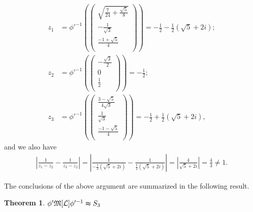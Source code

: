 \documentclass{amsart}
\newcommand{\LLL}{\mathcal L} %
\newcommand{\MMM}{\mathfrak M}
\newtheorem{theorem}{Theorem}[section]
\begin{document}
\begin{align*}
z_1 &= \phi'^{-1}( \left(
      \begin{array}{c}
       \sqrt{\frac{7}{24} + \frac{\sqrt{5}}{8}} \\
        -\frac{1}{\sqrt{3}} \\
       \frac{-1 + \sqrt{5}}{4} \\
      \end{array}
    \right) ) = -\frac{1}{2} - \frac{1}{2}(\sqrt{5} + 2i); \\
z_2 &= \phi'^{-1}(\left(
      \begin{array}{c}
        -\frac{\sqrt{3}}{2} \\
        0 \\
        \frac{1}{2} \\
      \end{array}
    \right)) = -\frac{1}{2};\\
z_3 &= \phi'^{-1}(\left(
      \begin{array}{c}
        \frac{3-\sqrt{5}}{4\sqrt{3}} \\
        \frac{1}{\sqrt{3}} \\
        \frac{-1-\sqrt{5}}{4} \\
      \end{array}
    \right)) = -\frac{1}{2} + \frac{1}{2}(\sqrt{5} + 2i),
\end{align*}
and we also have
\begin{align*}
|\frac{1}{z_1 - z_2} - \frac{1}{z_3 - z_2}| = |\frac{1}{- \frac{1}{2}(\sqrt{5} + 2i)} - \frac{1}{\frac{1}{2}(\sqrt{5} + 2i)}|
= |\frac{4}{\sqrt{5} + 2i}| = \frac{4}{3} \neq 1.
\end{align*}

The conclusions of the above argument are summarized in the following result.

\begin{theorem}
 $\phi' \MMM[\LLL] \phi'^{-1} \thickapprox S_3 $
\end{theorem}
\end{document}
